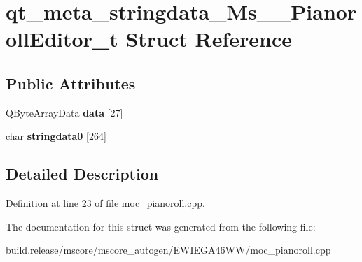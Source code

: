 \hypertarget{structqt__meta__stringdata___ms_____pianoroll_editor__t}{}\section{qt\+\_\+meta\+\_\+stringdata\+\_\+\+Ms\+\_\+\+\_\+\+Pianoroll\+Editor\+\_\+t Struct Reference}
\label{structqt__meta__stringdata___ms_____pianoroll_editor__t}
\subsection*{Public Attributes}
\begin{DoxyCompactItemize}
\item 
\mbox{\label{structqt__meta__stringdata___ms_____pianoroll_editor__t_ab22c60d16d8a1f38eef1bf0cd4835cdc}} 
Q\+Byte\+Array\+Data {\bfseries data} \mbox{[}27\mbox{]}
\item 
\mbox{\label{structqt__meta__stringdata___ms_____pianoroll_editor__t_ad56c48e2a455ae849d57297361a64f1b}} 
char {\bfseries stringdata0} \mbox{[}264\mbox{]}
\end{DoxyCompactItemize}


\subsection{Detailed Description}


Definition at line 23 of file moc\+\_\+pianoroll.\+cpp.



The documentation for this struct was generated from the following file\+:\begin{DoxyCompactItemize}
\item 
build.\+release/mscore/mscore\+\_\+autogen/\+E\+W\+I\+E\+G\+A46\+W\+W/moc\+\_\+pianoroll.\+cpp\end{DoxyCompactItemize}
